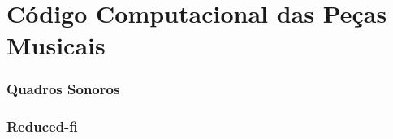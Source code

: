\chapter{Código Computacional das Peças Musicais}
\label{cap:codigoPecas}

\subsection{Quadros Sonoros}\label{ap:quadros}

\subsection{Reduced-fi}\label{ap:reduced}


